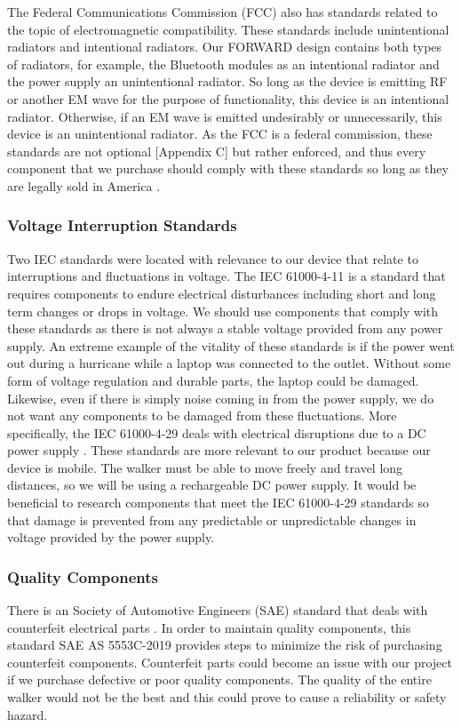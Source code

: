 \noindent The Federal Communications Commission (FCC) also has standards related to the topic of electromagnetic compatibility. These standards include unintentional radiators and intentional radiators. Our FORWARD design contains both types of radiators, for example, the Bluetooth modules as an intentional radiator and the power supply an unintentional radiator. So long as the device is emitting RF or another EM wave for the purpose of functionality, this device is an intentional radiator. Otherwise, if an EM wave is emitted undesirably or unnecessarily, this device is an unintentional radiator. As the FCC is a federal commission, these standards are not optional [Appendix C] but rather enforced, and thus every component that we purchase should comply with these standards so long as they are legally sold in America \cite{fcc_unintentional_radiators} \cite{fcc_intentional_radiators}.

\subsubsection{Voltage Interruption Standards}
\noindent Two IEC standards were located with relevance to our device that relate to interruptions and fluctuations in voltage. The IEC 61000-4-11\cite{iec_standard_2} is a standard that requires components to endure electrical disturbances including short and long term changes or drops in voltage. We should use components that comply with these standards as there is not always a stable voltage provided from any power supply. An extreme example of the vitality of these standards is if the power went out during a hurricane while a laptop was connected to the outlet. Without some form of voltage regulation and durable parts, the laptop could be damaged. Likewise, even if there is simply noise coming in from the power supply, we do not want any components to be damaged from these fluctuations. More specifically, the IEC 61000-4-29 deals with electrical disruptions due to a DC power supply \cite{iec_standard_3}. These standards are more relevant to our product because our device is mobile. The walker must be able to move freely and travel long distances, so we will be using a rechargeable DC power supply. It would be beneficial to research components that meet the IEC 61000-4-29 standards so that damage is prevented from any predictable or unpredictable changes in voltage provided by the power supply.


\subsubsection{Quality Components}
\noindent There is an Society of Automotive Engineers (SAE) standard that deals with counterfeit electrical parts \cite{sae5553c2019}. In order to maintain quality components, this standard SAE AS 5553C-2019 provides steps to minimize the risk of purchasing counterfeit components. Counterfeit parts could become an issue with our project if we purchase defective or poor quality components. The quality of the entire walker would not be the best and this could prove to cause a reliability or safety hazard.

